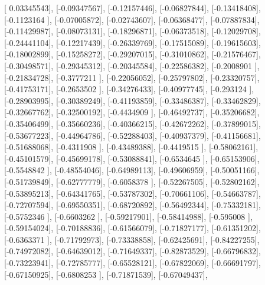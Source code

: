 \documentclass{article}
\begin{document}
       [ 0.03345543],
       [-0.09347567],
       [-0.12157446],
       [-0.06827844],
       [-0.13418408],
       [-0.1123164 ],
       [-0.07005872],
       [-0.02743607],
       [-0.06368477],
       [-0.07887834],
       [-0.11429987],
       [-0.08073131],
       [-0.18296871],
       [-0.06373518],
       [-0.12029708],
       [-0.24441104],
       [-0.12217439],
       [-0.26339769],
       [-0.17515089],
       [-0.19615603],
       [-0.18002899],
       [-0.15258272],
       [-0.29207015],
       [-0.31010862],
       [-0.21576467],
       [-0.30498571],
       [-0.29345312],
       [-0.20345584],
       [-0.22586382],
       [-0.2008901 ],
       [-0.21834728],
       [-0.3777211 ],
       [-0.22056052],
       [-0.25797802],
       [-0.23320757],
       [-0.41753171],
       [-0.2653502 ],
       [-0.34276433],
       [-0.40977745],
       [-0.293124  ],
       [-0.28903995],
       [-0.30389249],
       [-0.41193859],
       [-0.33486387],
       [-0.33462829],
       [-0.32667762],
       [-0.32500192],
       [-0.4434909 ],
       [-0.46492737],
       [-0.35206682],
       [-0.35406499],
       [-0.35660236],
       [-0.40366215],
       [-0.42672262],
       [-0.37899015],
       [-0.53677223],
       [-0.44964786],
       [-0.52288403],
       [-0.40937379],
       [-0.41156681],
       [-0.51688068],
       [-0.4311908 ],
       [-0.43489388],
       [-0.4419515 ],
       [-0.58062161],
       [-0.45101579],
       [-0.45699178],
       [-0.53088841],
       [-0.6534645 ],
       [-0.65153906],
       [-0.5548842 ],
       [-0.48554046],
       [-0.64989113],
       [-0.49606959],
       [-0.50051166],
       [-0.51739849],
       [-0.62777779],
       [-0.6058378 ],
       [-0.52267505],
       [-0.52802162],
       [-0.53895213],
       [-0.64341765],
       [-0.53787302],
       [-0.70661106],
       [-0.54663787],
       [-0.72707594],
       [-0.69550351],
       [-0.68720892],
       [-0.56492344],
       [-0.75332181],
       [-0.5752346 ],
       [-0.6603262 ],
       [-0.59217901],
       [-0.58414988],
       [-0.595008  ],
       [-0.59154024],
       [-0.70188836],
       [-0.61566079],
       [-0.71827177],
       [-0.61351202],
       [-0.6363371 ],
       [-0.71792973],
       [-0.73338858],
       [-0.62425691],
       [-0.84227255],
       [-0.74972082],
       [-0.64639012],
       [-0.71649337],
       [-0.82873529],
       [-0.66796832],
       [-0.73223941],
       [-0.72785777],
       [-0.65528121],
       [-0.67822069],
       [-0.66691797],
       [-0.67150925],
       [-0.6808253 ],
       [-0.71871539],
       [-0.67049437],
\end{document}
